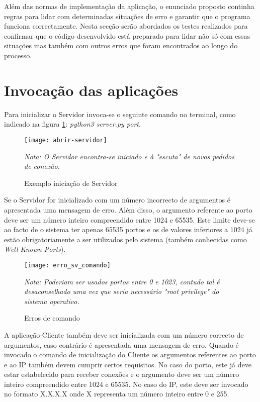 Além das normas de implementação da aplicação, o enunciado proposto continha regras para lidar com determinadas situações de erro e garantir que o programa funciona correctamente. Nesta secção serão abordados os testes realizados para confirmar que o código desenvolvido está preparado para lidar não só com essas situações mas também com outros erros que foram encontrados ao longo do processo.

\section{Invocação das aplicações}
\label{sec.testes-servidor}
Para inicializar o Servidor invoca-se o seguinte comando no terminal, como indicado na figura \ref{fig:abrir-servidor}: {\large\textsl{python3 server.py port}}. 

\begin{center}	
	\begin{figure}[H]
		\centering
		\texttt{[image: abrir-servidor]}
		\caption{Exemplo iniciação de Servidor\\}
		\label{fig:abrir-servidor}
		\flushleft\small\textit{Nota: O Servidor encontra-se iniciado e à "escuta" de novos pedidos de conexão.}
	\end{figure}
\end{center}

Se o Servidor for inicializado com um número incorrecto de argumentos é apresentada uma mensagem de erro. Além disso, o argumento referente ao porto deve ser um número inteiro compreendido entre 1024 e 65535. Este limite deve-se ao facto de o sistema ter apenas 65535 portos e os de valores inferiores a 1024 já estão obrigatoriamente a ser utilizados pelo sistema (também conhecidas como \textit{Well-Known Ports}).

\begin{center}	
	\begin{figure}[H]
		\centering
		\texttt{[image: erro\_sv\_comando]}
		\caption{Erros de comando\\}
		\label{fig:erro_sv_comando}
		\flushleft\small\textit{Nota: Poderiam ser usados portos entre 0 e 1023, contudo tal é desaconselhado uma vez que seria necessário "root privilege" do sistema operativo.}
	\end{figure}
\end{center}

A aplicação-Cliente também deve ser inicializada com um número correcto de argumentos, caso contrário é apresentada uma mensagem de erro. Quando é invocado o comando de inicialização do Cliente os argumentos referentes ao porto e ao IP também devem cumprir certos requisitos. No caso do porto, este já deve estar estabelecido para receber conexões e o argumento deve ser um número inteiro compreendido entre 1024 e 65535. No caso do IP, este deve ser invocado no formato X.X.X.X onde X representa um número inteiro entre 0 e 255.

